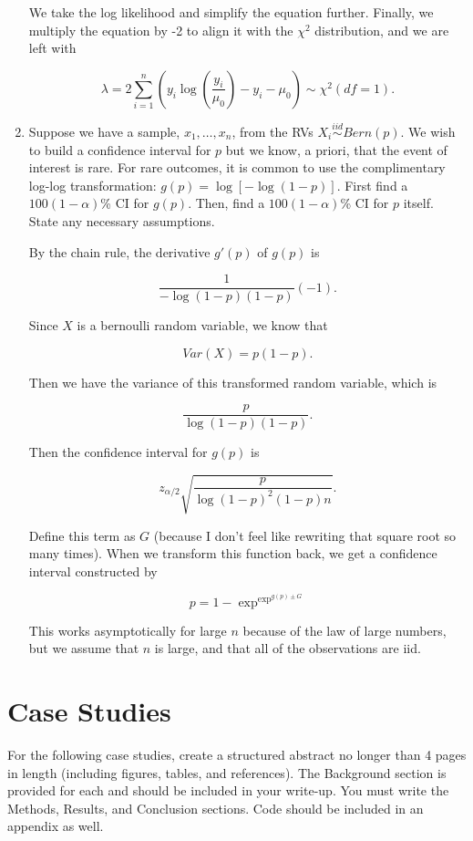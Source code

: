 \documentclass{article}
\begin{document}
\begin{enumerate}
		We take the log likelihood and simplify the equation further. Finally, we multiply the equation by -2 to align it with the $\chi^2$ distribution, and we are left with

		$$\lambda = 2 \sum_{i=1}^{n} \left( y_i \log\left( \frac{y_i}{\mu_0} \right) - y_i - \mu_0 \right) \sim \chi^2(df = 1).$$

		\item Suppose we have a sample, $x_1, \ldots, x_n$, from the RVs $X_i \stackrel{iid}{\sim} Bern(p)$. We wish to build a confidence interval for $p$ but we know, a priori, that the event of interest is rare. For rare outcomes, it is common to use the complimentary log-log transformation: $g(p) = \log\left[ -\log(1-p) \right]$. First find a $100(1-\alpha)$\% CI for $g(p)$. Then, find a $100(1-\alpha)$\% CI for $p$ itself. State any necessary assumptions.
		
		By the chain rule, the derivative $g'(p)$ of $g(p)$ is

		$$\frac{1}{-\log(1 - p) (1 - p)} (-1).$$

		Since $X$ is a bernoulli random variable, we know that

		$$Var(X) = p(1 - p).$$

		Then we have the variance of this transformed random variable, which is

		$$\frac{p}{\log(1 - p)(1 - p)}.$$

		Then the confidence interval for $g(p)$ is

		$$z_{\alpha / 2} \sqrt{\frac{p}{\log(1 - p)^2(1 - p)n}}.$$

		Define this term as $G$ (because I don't feel like rewriting that square root so many times). When we transform this function back, we get a confidence interval constructed by

		$$p = 1 - \exp^{\exp^ { g(p) \pm G }} $$

		This works asymptotically for large $n$ because of the law of large numbers, but we assume that $n$ is large, and that all of the observations are iid.



	\end{enumerate}

	\newpage

	\section*{Case Studies}
	For the following case studies, create a structured abstract no longer than 4 pages in length (including figures, tables, and references). The Background section is provided for each and should be included in your write-up. You must write the Methods, Results, and Conclusion sections. Code should be included in an appendix as well.
\end{document}
